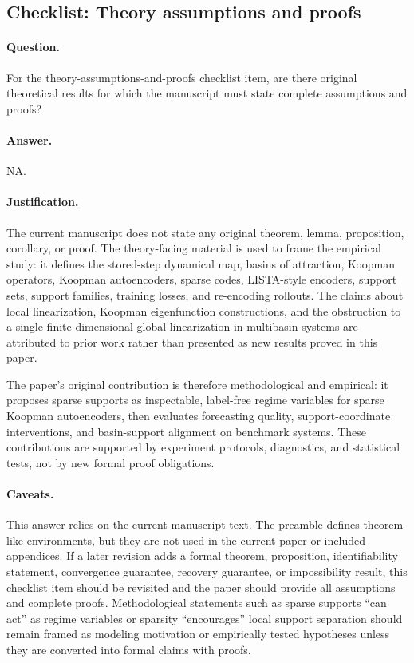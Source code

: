 \subsection{Checklist: Theory assumptions and proofs}
\label{app:checklist_theory_assumptions_proofs}

\paragraph{Question.}
For the theory-assumptions-and-proofs checklist item, are there original theoretical results for which the manuscript must state complete assumptions and proofs?

\paragraph{Answer.}
NA.

\paragraph{Justification.}
The current manuscript does not state any original theorem, lemma, proposition, corollary, or proof. The theory-facing material is used to frame the empirical study: it defines the stored-step dynamical map, basins of attraction, Koopman operators, Koopman autoencoders, sparse codes, LISTA-style encoders, support sets, support families, training losses, and re-encoding rollouts. The claims about local linearization, Koopman eigenfunction constructions, and the obstruction to a single finite-dimensional global linearization in multibasin systems are attributed to prior work rather than presented as new results proved in this paper.

The paper's original contribution is therefore methodological and empirical: it proposes sparse supports as inspectable, label-free regime variables for sparse Koopman autoencoders, then evaluates forecasting quality, support-coordinate interventions, and basin-support alignment on benchmark systems. These contributions are supported by experiment protocols, diagnostics, and statistical tests, not by new formal proof obligations.

\paragraph{Caveats.}
This answer relies on the current manuscript text. The preamble defines theorem-like environments, but they are not used in the current paper or included appendices. If a later revision adds a formal theorem, proposition, identifiability statement, convergence guarantee, recovery guarantee, or impossibility result, this checklist item should be revisited and the paper should provide all assumptions and complete proofs. Methodological statements such as sparse supports ``can act'' as regime variables or sparsity ``encourages'' local support separation should remain framed as modeling motivation or empirically tested hypotheses unless they are converted into formal claims with proofs.
